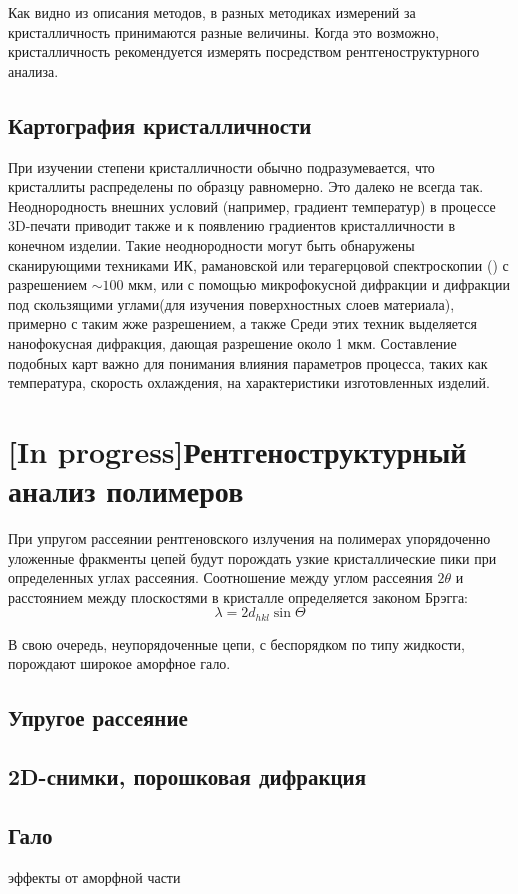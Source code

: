 Как видно из описания методов, в разных методиках измерений за кристалличность принимаются разные величины. Когда это возможно, кристалличность рекомендуется измерять посредством рентгеноструктурного анализа. 


\subsection{Картография кристалличности}
При изучении степени кристалличности обычно подразумевается, что кристаллиты распределены по образцу равномерно. Это далеко не всегда так. Неоднородность внешних условий (например, градиент температур) в процессе 3D-печати приводит также и к появлению градиентов кристалличности в конечном изделии. 
Такие неоднородности могут быть обнаружены сканирующими техниками ИК, рамановской или терагерцовой спектроскопии (\cite{thz})  с разрешением $\sim 100$ мкм, или с помощью микрофокусной дифракции и дифракции под скользящими углами(для изучения поверхностных слоев материала), примерно с таким жже разрешением, а также  Среди этих техник выделяется нанофокусная дифракция, дающая разрешение около 1 мкм.
Составление подобных карт важно для понимания влияния параметров процесса, таких как температура, скорость охлаждения, на характеристики изготовленных изделий.



\section{[In progress]Рентгеноструктурный анализ полимеров}
\cite{2d-diff}

При упругом рассеянии рентгеновского излучения на полимерах упорядоченно уложенные фракменты цепей будут порождать узкие кристаллические пики при определенных углах рассеяния. 
Соотношение между углом рассеяния $2\theta$ и расстоянием между плоскостями в кристалле определяется законом Брэгга:
\[
\lambda = 2d_{hkl} \sin \Theta
\]


В свою очередь, неупорядоченные цепи, с беспорядком по типу жидкости, порождают широкое аморфное гало. 

\subsection{Упругое рассеяние}
\subsection{2D-снимки, порошковая дифракция}
\subsection{Гало}
эффекты от аморфной части

